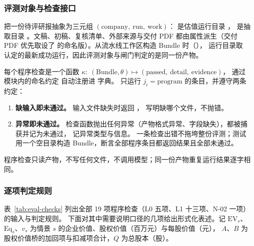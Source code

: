 \subsubsection{评测对象与检查接口}

 把一份待评研报抽象为三元组 $(\text{company},\ \text{run},\ \text{work})$： 是估值运行目录
， 是抽取目录 。文稿、初稿、复核清单、外部来源与交付 PDF
都由属性派生（交付 PDF 优先取设了  的命名版）。从流水线工作区构造 Bundle 时（），
运行目录取  认定的最新成功运行，因此评测对象与闸门判定的是同一份产物。

每个程序检查是一个函数 $\kappa:\ (\text{Bundle},\theta)\mapsto(\text{passed},\ \text{detail},\ \text{evidence})$，
通过模块内的命名约定  自动注册进  字典。 只运行 $j_i=\text{program}$ 的条目，并遵守两条约定：
\begin{enumerate}
  \item \textbf{缺输入即未通过。} 输入文件缺失时返回 ， 写明缺哪个文件，不抛错。
  \item \textbf{异常即未通过。} 检查函数抛出任何异常（产物格式异常、字段缺失），都被捕获并记为未通过， 记异常类型与信息。
        一条检查出错不拖垮整份评测；测试用一个空目录构造 Bundle，断言全部程序条目都返回结果且全部未通过。
\end{enumerate}
程序检查只读产物，不写任何文件，不调用模型；同一份产物重复运行结果逐字相同。

\subsubsection{逐项判定规则}

表~\ref{tab:eval-checks} 列出全部 19 项程序检查（L0 五项、L1 十三项、N-02 一项）的输入与判定规则。
下面对其中需要说明口径的几项给出形式化表述。记 $\mathrm{EV}_s$、$\mathrm{Eq}_s$、$v_s$ 为情景 $s$ 的企业价值、股权价值（百万元）与每股价值（元），
$A$、$B$ 为股权价值桥的加回项与扣减项合计，$Q$ 为总股本（股）。

